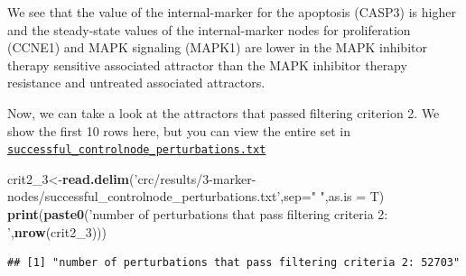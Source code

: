 \documentclass[
]{book}
\newenvironment{Shaded}{\begin{snugshade}}{\end{snugshade}}
\newcommand{\DataTypeTok}[1]{\textcolor[rgb]{0.13,0.29,0.53}{#1}}
\newcommand{\DecValTok}[1]{\textcolor[rgb]{0.00,0.00,0.81}{#1}}
\newcommand{\KeywordTok}[1]{\textcolor[rgb]{0.13,0.29,0.53}{\textbf{#1}}}
\newcommand{\NormalTok}[1]{#1}
\newcommand{\OperatorTok}[1]{\textcolor[rgb]{0.81,0.36,0.00}{\textbf{#1}}}
\newcommand{\StringTok}[1]{\textcolor[rgb]{0.31,0.60,0.02}{#1}}
\begin{document}
We see that the value of the internal-marker for the apoptosis (CASP3) is higher and the steady-state values of the internal-marker nodes for proliferation (CCNE1) and MAPK signaling (MAPK1) are lower in the MAPK inhibitor therapy sensitive associated attractor than the MAPK inhibitor therapy resistance and untreated associated attractors.

Now, we can take a look at the attractors that passed filtering criterion 2. We show the first 10 rows here, but you can view the entire set in \href{https://github.com/VeraLiconaResearchGroup/Netisce/blob/main/colorectal_cancer_validation/results/3-marker-nodes/successful_controlnode_perturbations.txt}{\texttt{successful\_controlnode\_perturbations.txt}}

\begin{Shaded}
\begin{Highlighting}[]
\NormalTok{crit2_}\DecValTok{3}\NormalTok{<-}\KeywordTok{read.delim}\NormalTok{(}\StringTok{'crc/results/3-marker-nodes/successful_controlnode_perturbations.txt'}\NormalTok{,}\DataTypeTok{sep=}\StringTok{" "}\NormalTok{,}\DataTypeTok{as.is =}\NormalTok{ T)}
\KeywordTok{print}\NormalTok{(}\KeywordTok{paste0}\NormalTok{(}\StringTok{'number of perturbations that pass filtering criteria 2: '}\NormalTok{,}\KeywordTok{nrow}\NormalTok{(crit2_}\DecValTok{3}\NormalTok{)))}
\end{Highlighting}
\end{Shaded}

\begin{verbatim}
## [1] "number of perturbations that pass filtering criteria 2: 52703"
\end{verbatim}

\begin{Shaded}
\end{Shaded}
\end{document}
